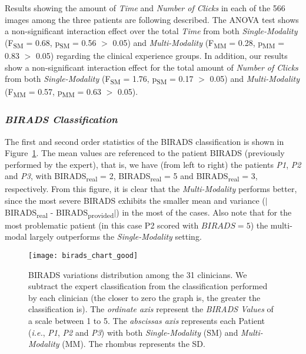 Results showing the amount of \textit{Time} and \textit{Number of Clicks} in each of the 566 images among the three patients are following described.
The ANOVA test shows a non-significant interaction effect over the total \textit{Time} from both \textit{Single-Modality} (F\textsubscript{SM} = 0.68, p\textsubscript{SM} = 0.56 $>$ 0.05) and \textit{Multi-Modality} (F\textsubscript{MM} = 0.28, p\textsubscript{MM} = 0.83 $>$ 0.05) regarding the clinical experience groups.
In addition, our results show a non-significant interaction effect for the total amount of \textit{Number of Clicks} from both \textit{Single-Modality} (F\textsubscript{SM} = 1.76, p\textsubscript{SM} = 0.17 $>$ 0.05) and \textit{Multi-Modality} (F\textsubscript{MM} = 0.57, p\textsubscript{MM} = 0.63 $>$ 0.05).

\subsubsection{\textit{BIRADS Classification}}

The first and second order statistics of the BIRADS classification is shown in Figure~\ref{fig:birads_chart}.
The mean values are referenced to the patient BIRADS (previously performed by the expert), that is, we have (from left to right) the patients \textit{P1}, \textit{P2} and \textit{P3}, with BIRADS\textsubscript{real} = 2, BIRADS\textsubscript{real} = 5 and BIRADS\textsubscript{real} = 3, respectively.
From this figure, it is clear that the \textit{Multi-Modality} performs better, since the most severe BIRADS exhibits the smaller mean and variance ($|$BIRADS\textsubscript{real} - BIRADS\textsubscript{provided}$|$) in the most of the cases. Also note that for the most problematic patient (in this case P2 scored with $BIRADS=5$) the multi-modal largely outperforms the \textit{Single-Modality} setting.

\begin{figure}[ht]
\centering
\texttt{[image: birads\_chart\_good]}
\caption{\scriptsize BIRADS variations distribution among the 31 clinicians.
We subtract the expert classification from the classification performed by each clinician
(the closer to zero the graph is, the greater the classification is). The \textit{ordinate axis} represent the \textit{BIRADS Values} of a scale between 1 to 5.
The \textit{abscissas axis} represents each Patient ({\em i.e.}, \textit{P1}, \textit{P2} and \textit{P3}) with both \textit{Single-Modality} (SM) and \textit{Multi-Modality} (MM).
The rhombus represents the SD.}
\label{fig:birads_chart}
\end{figure}


